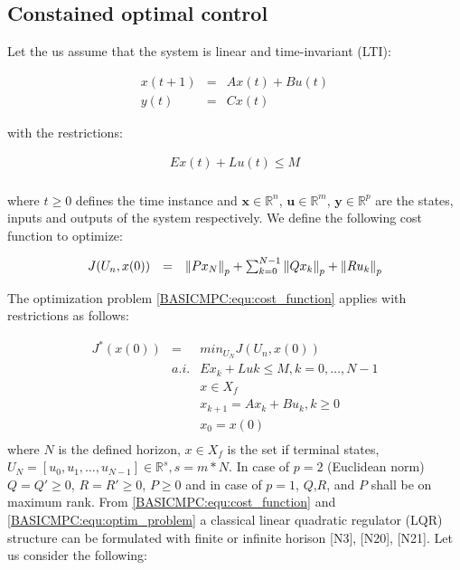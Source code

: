 	\subsection{Constained optimal control}
	
	Let the us assume that the system is linear and time-invariant (LTI):
	
	    \begin{equation}
        \begin{array}{rcl}
            x(t+1)&=&Ax(t)+Bu(t)\\
						y(t)&=&Cx(t)
        \end{array}
        \label{BASICMPC:equ:basic_LTI}
    \end{equation}
		
	with the restrictions:
	
	\begin{equation}
        \begin{array}{rcl}
            Ex(t)+Lu(t)\leq M\\
        \end{array}
        \label{BASICMPC:equ:restrict_LTI}
    \end{equation}
		
		where $t\geq0$ defines the time instance and $\textbf{x}\in \mathbb{R}^n$, $\textbf{u}\in \mathbb{R}^m$, $\textbf{y}\in \mathbb{R}^p$ are the states, inputs and outputs of the system respectively. We define the following cost function to optimize:
		
		\begin{equation}
        \begin{array}{rcl}
         J(U_n,x(0))&=&\left\lVert{Px_N}\right\rVert_p+\sum^{N-1}_{k=0}\left\lVert Qx_k\right\rVert_p+\left\lVert Ru_k\right\rVert_p\\
        \end{array}
        \label{BASICMPC:equ:cost_function}
    \end{equation}
		
		The optimization problem \ref{BASICMPC:equ:cost_function} applies with restrictions as follows:
		
		\begin{equation}
        \begin{array}{rcl}
				J^*(x(0))&=&min_{U_N}J(U_n,x(0))\\
					&a.i.&Ex_k+Luk\leq M,k=0,\dots,N-1\\
					&&x\in X_f\\
					&&x_{k+1}=Ax_k+Bu_k,k\geq0\\
					&&x_0=x(0)\\
        \end{array}
        \label{BASICMPC:equ:optim_problem}
    \end{equation}
		where $N$ is the defined horizon, $x\in X_f$ is the set if terminal states, $U_N=[u_0,u_1,\dots,u_{N-1}]\in\mathbb{R}^s,s=m*N$. In case of $p=2$ (Euclidean norm) $Q=Q'\geq0$, $R=R'\geq0$, $P\geq0$ and in case of $p=1$, $Q$,$R$, and $P$ shall be on maximum rank.
		From \ref{BASICMPC:equ:cost_function} and \ref{BASICMPC:equ:optim_problem} a classical linear quadratic regulator (LQR) structure can be formulated with finite or infinite horison [N3], [N20], [N21].
		Let us consider the following:
		
